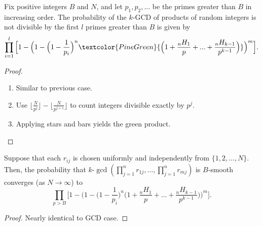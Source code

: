 \documentclass[11pt,xcolor={dvipsnames}]{beamer}
\begin{document}
	\begin{frame}
		\begin{theorem}
			Fix positive integers $B$ and $N$, and let $p_1, p_2, ...$ be the primes greater than $B$ in increasing order. The probability of the $k$-GCD of products of random integers is not divisible by the first $l$ primes greater than $B$ is given by 
			$$\prod_{i=1}^{l} \Big[1 - \Big(1 - \Big(1-\frac{1}{p_i}\Big)^n \textcolor{PineGreen}{\Big(1 + \frac{{}_nH_1}{p} + ... + \frac{{}_nH_{k-1}}{p^{k-1}}\Big)}\Big)^m\Big].$$
		\end{theorem}
	
		\begin{proof}
			\begin{enumerate}
				\item Similar to previous case.
				\item Use
				$\Big\lfloor\frac{N}{p^j}\Big\rfloor - \Big\lfloor\frac{N}{p^{j+1}}\Big\rfloor$ to count integers divisible exactly by $p^j$.
				\item Applying stars and bars yields the \textcolor{PineGreen}{green product}.
			\end{enumerate}
		\end{proof}
	\end{frame}

	\begin{frame}
		\begin{theorem} Suppose that each $r_{ij}$ is chosen uniformly and independently from $\{1, 2, ..., N\}$. Then, the probability that $k\text{-}\gcd(\prod_{j=1}^n r_{1j}, ... , \prod_{j=1}^n r_{mj})$ is $B$-smooth converges (as $N \to \infty$) to
			$$\prod_{p>B} \Big[1 - \Big(1 - \Big(1-\frac{1}{p_i}\Big)^n \Big(1 + \frac{{}_nH_1}{p} + ... + \frac{{}_nH_{k-1}}{p^{k-1}}\Big)\Big)^m\Big].$$
		\end{theorem}
	
		\begin{proof}
			Nearly identical to GCD case.
		\end{proof}
	\end{frame}
\end{document}
